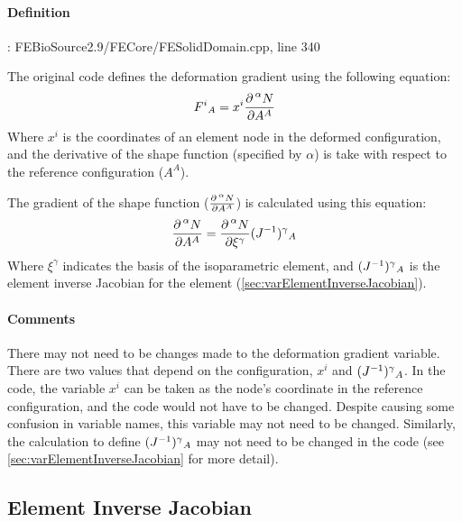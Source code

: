 \documentclass{article}
\begin{document}
    \paragraph{Definition}: FEBioSource2.9/FECore/FESolidDomain.cpp, line 340

    The original code defines the deformation gradient using the following equation:
    \begin{equation*}
        F^i\mathstrut_A = x^i \frac{\partial \prescript{\alpha}{}N}{\partial A^A}
    \end{equation*}
    Where $x^i$ is the coordinates of an element node in the deformed configuration, and the derivative of the shape function (specified by $\alpha$) is take with respect to the reference configuration ($A^A$).

    The gradient of the shape function ($\frac{\partial \prescript{\alpha}{}N}{\partial A^A}$) is calculated using this equation:
    \begin{equation*}
        \frac{\partial \prescript{\alpha}{}N}{\partial A^A} = \frac{\partial \prescript{\alpha}{}N}{\partial \xi^\gamma}(J^{-1})^\gamma\mathstrut_A
    \end{equation*}
    Where $\xi^\gamma$ indicates the basis of the isoparametric element, and $(J^{-1})^\gamma\mathstrut_A$ is the element inverse Jacobian for the element (\autoref{sec:varElementInverseJacobian}).

    \paragraph{Comments}
    There may not need to be changes made to the deformation gradient variable. There are two values that depend on the configuration, $x^i$ and $(J^{-1})^\gamma\mathstrut_A$. In the code, the variable $x^i$ can be taken as the node's coordinate in the reference configuration, and the code would not have to be changed. Despite causing some confusion in variable names, this variable may not need to be changed. Similarly, the calculation to define $(J^{-1})^\gamma\mathstrut_A$ may not need to be changed in the code (see \autoref{sec:varElementInverseJacobian} for more detail).
    
\label{sec:varElementInverseJacobian}
\subsection*{Element Inverse Jacobian}
\end{document}

